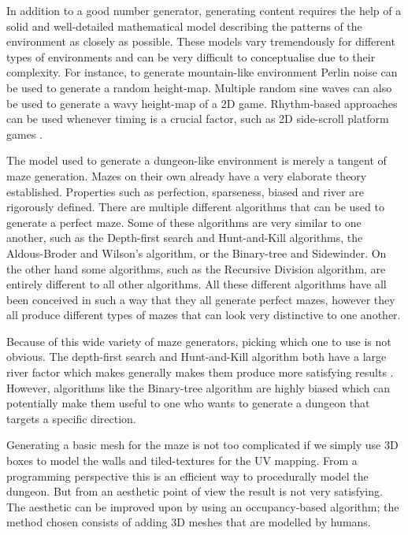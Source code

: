 In addition to a good number generator, generating content requires the help of a solid and well-detailed mathematical model describing the patterns of the environment as closely as possible. These models vary tremendously for different types of environments and can be very difficult to conceptualise due to their complexity. For instance, to generate mountain-like environment Perlin noise can be used to generate a random height-map. Multiple random sine waves can also be used to generate a wavy height-map of a 2D game. Rhythm-based approaches can be used whenever timing is a crucial factor, such as 2D side-scroll platform games \citep{DBLP:journals/tciaig/SmithWMTMC11}. 

The model used to generate a dungeon-like environment is merely a tangent of maze generation. Mazes on their own already have a very elaborate theory established. Properties such as perfection, sparseness, biased and river are rigorously defined. There are multiple different algorithms that can be used to generate a perfect maze. Some of these algorithms are very similar to one another, such as the Depth-first search and Hunt-and-Kill algorithms, the Aldous-Broder and Wilson's algorithm, or the Binary-tree and Sidewinder. On the other hand some algorithms, such as the Recursive Division algorithm, are entirely different to all other algorithms. All these different algorithms have all been conceived in such a way that they all generate perfect mazes, however they all produce different types of mazes that can look very distinctive to one another.

Because of this wide variety of maze generators, picking which one to use is not obvious. The depth-first search and Hunt-and-Kill algorithm both have a large river factor which makes generally makes them produce more satisfying results \citep{JBuck}. However, algorithms like the Binary-tree algorithm are highly biased \citep{ThinkLabyrinth} which can potentially make them useful to one who wants to generate a dungeon that targets a specific direction.

Generating a basic mesh for the maze is not too complicated if we simply use 3D boxes to model the walls and tiled-textures for the UV mapping. From a programming perspective this is an efficient way to procedurally model the dungeon. But from an aesthetic point of view the result is not very satisfying. The aesthetic can be improved upon by using an occupancy-based algorithm; the method chosen consists of adding 3D meshes that are modelled by humans.


